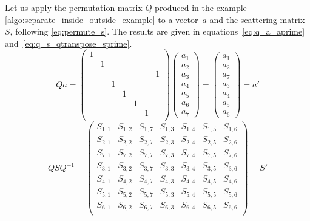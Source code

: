 Let us apply the permutation matrix $Q$ produced in the example \cref{algo:separate_inside_outside_example} to a vector~$a$ and the scattering matrix~$S$, following \cref{eq:permute_s}.
The results are given in equations~\eqref{eq:q_a_aprime} and~\eqref{eq:q_s_qtranspose_sprime}.
\begin{equation}
    Q a
    =
    \begin{pmatrix}
        1  &     &     &     &     &     &     \\
           &  1  &     &     &     &     &     \\
           &     &     &     &     &     &  1  \\
           &     &  1  &     &     &     &     \\
           &     &     &  1  &     &     &     \\
           &     &     &     &  1  &     &     \\
           &     &     &     &     &  1  &     \\
    \end{pmatrix}
    \begin{pmatrix}
        a_1 \\ a_2 \\ a_3 \\ a_4 \\ a_5 \\ a_6 \\ a_7
    \end{pmatrix}
    =
    \begin{pmatrix}
        a_1 \\ a_2 \\ a_7 \\ a_3 \\ a_4 \\ a_5 \\ a_6
    \end{pmatrix}
    =
    a'
    \label{eq:q_a_aprime}
\end{equation}
\begin{equation}
    Q S Q^{-1}
    =
    \begin{pmatrix}
        S_{1,1} & S_{1,2} & S_{1,7} & S_{1,3} & S_{1,4} & S_{1,5} & S_{1,6} \\
        S_{2,1} & S_{2,2} & S_{2,7} & S_{2,3} & S_{2,4} & S_{2,5} & S_{2,6} \\
        S_{7,1} & S_{7,2} & S_{7,7} & S_{7,3} & S_{7,4} & S_{7,5} & S_{7,6} \\
        S_{3,1} & S_{3,2} & S_{3,7} & S_{3,3} & S_{3,4} & S_{3,5} & S_{3,6} \\
        S_{4,1} & S_{4,2} & S_{4,7} & S_{4,3} & S_{4,4} & S_{4,5} & S_{4,6} \\
        S_{5,1} & S_{5,2} & S_{5,7} & S_{5,3} & S_{5,4} & S_{5,5} & S_{5,6} \\
        S_{6,1} & S_{6,2} & S_{6,7} & S_{6,3} & S_{6,4} & S_{6,5} & S_{6,6} \\
    \end{pmatrix}
    =
    S'
    \label{eq:q_s_qtranspose_sprime}
\end{equation}

